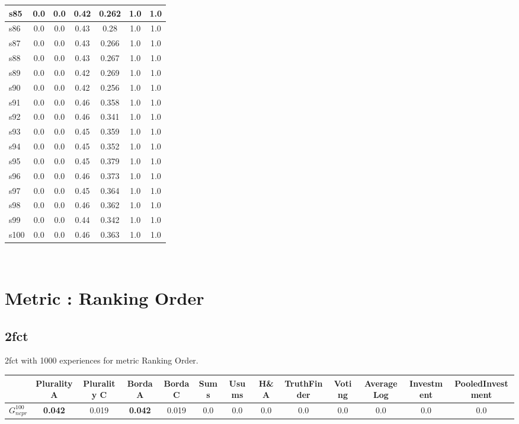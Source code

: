 \documentclass{article}
\newcommand{\graph}[2]{$G_{#1}^{#2}$}
\begin{document}
\begin{tabular}{|l|c|c|c|c|c|c|}
\hline
s85 &0.0 & 0.0 & 0.42 & 0.262 & 1.0 & 1.0\\
\hline
s86 &0.0 & 0.0 & 0.43 & 0.28 & 1.0 & 1.0\\
\hline
s87 &0.0 & 0.0 & 0.43 & 0.266 & 1.0 & 1.0\\
\hline
s88 &0.0 & 0.0 & 0.43 & 0.267 & 1.0 & 1.0\\
\hline
s89 &0.0 & 0.0 & 0.42 & 0.269 & 1.0 & 1.0\\
\hline
s90 &0.0 & 0.0 & 0.42 & 0.256 & 1.0 & 1.0\\
\hline
s91 &0.0 & 0.0 & 0.46 & 0.358 & 1.0 & 1.0\\
\hline
s92 &0.0 & 0.0 & 0.46 & 0.341 & 1.0 & 1.0\\
\hline
s93 &0.0 & 0.0 & 0.45 & 0.359 & 1.0 & 1.0\\
\hline
s94 &0.0 & 0.0 & 0.45 & 0.352 & 1.0 & 1.0\\
\hline
s95 &0.0 & 0.0 & 0.45 & 0.379 & 1.0 & 1.0\\
\hline
s96 &0.0 & 0.0 & 0.46 & 0.373 & 1.0 & 1.0\\
\hline
s97 &0.0 & 0.0 & 0.45 & 0.364 & 1.0 & 1.0\\
\hline
s98 &0.0 & 0.0 & 0.46 & 0.362 & 1.0 & 1.0\\
\hline
s99 &0.0 & 0.0 & 0.44 & 0.342 & 1.0 & 1.0\\
\hline
s100 &0.0 & 0.0 & 0.46 & 0.363 & 1.0 & 1.0\\
\hline
\end{tabular}\\

\newpage
\section{Metric : Ranking Order}

\newpage

\subsection{2fct}

2fct with 1000 experiences for metric Ranking Order.

\noindent\begin{tabular}{|l|c|c|c|c|c|c|c|c|c|c|c|c|}
\hline
& Plurality A& Plurality C& Borda A& Borda C& Sums& Usums& H\&A& TruthFinder& Voting& AverageLog& Investment& PooledInvestment\\
\hline
\graph{ncpr}{100} &\textbf{0.042}&0.019&\textbf{0.042}&0.019&0.0&0.0&0.0&0.0&0.0&0.0&0.0&0.0\\
\hline
\end{tabular}
\newpage
\end{document}
